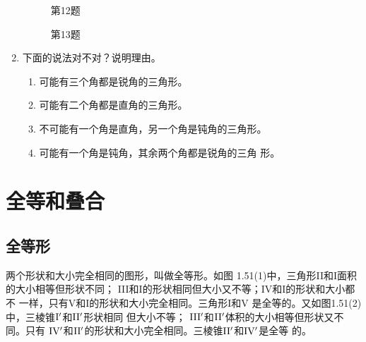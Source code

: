 \begin{enumerate}
\begin{figure}[htp]\centering
    \begin{minipage}[t]{0.48\textwidth}
    \centering
{}
    \caption*{第12题}
    \end{minipage}
    \begin{minipage}[t]{0.48\textwidth}
    \centering
    \caption*{第13题}
    \end{minipage}
    \end{figure}


\item 下面的说法对不对？说明理由。
\begin{enumerate}
\item 可能有三个角都是锐角的三角形。
\item 可能有二个角都是直角的三角形。
\item 不可能有一个角是直角，另一个角是钝角的三角形。
\item 可能有一个角是钝角，其余两个角都是锐角的三角
形。
\end{enumerate}
\end{enumerate}

\section{全等和叠合}

\subsection{全等形}
两个形状和大小完全相同的图形，叫做全等形。如图
1.51(1)中，三角形II和I面积的大小相等但形状不同；
III和I的形状相同但大小又不等；IV和I的形状和大小都不
一样，只有V和I的形状和大小完全相同。三角形I和V
是全等的。又如图1.51(2)中，三棱锥$\rm I'$和$\rm II'$形状相同
但大小不等；
$\rm III'$和$\rm II'$体积的大小相等但形状又不同。只有
$\rm IV'$和$\rm II'$的形状和大小完全相同。三棱锥$\rm II'$和$\rm IV'$是全等
的。









